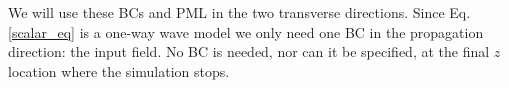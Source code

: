\documentclass[]{article}
\begin{document}
	We will use these BCs and PML in the two transverse directions. Since Eq. \eqref{scalar_eq} is a one-way wave model we only need one BC in the propagation direction: the input field. No BC is needed, nor can it be specified, at the final $z$ location where the simulation stops.
	
	
	
	
	
	
\end{document}
